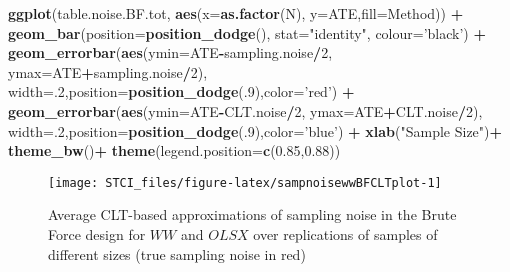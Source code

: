 \documentclass[]{book}
\newenvironment{Shaded}{\begin{snugshade}}{\end{snugshade}}
\newcommand{\KeywordTok}[1]{\textcolor[rgb]{0.13,0.29,0.53}{\textbf{#1}}}
\newcommand{\DataTypeTok}[1]{\textcolor[rgb]{0.13,0.29,0.53}{#1}}
\newcommand{\DecValTok}[1]{\textcolor[rgb]{0.00,0.00,0.81}{#1}}
\newcommand{\FloatTok}[1]{\textcolor[rgb]{0.00,0.00,0.81}{#1}}
\newcommand{\StringTok}[1]{\textcolor[rgb]{0.31,0.60,0.02}{#1}}
\newcommand{\OperatorTok}[1]{\textcolor[rgb]{0.81,0.36,0.00}{\textbf{#1}}}
\newcommand{\NormalTok}[1]{#1}
\theoremstyle{definition}
\theoremstyle{definition}
\theoremstyle{definition}
\theoremstyle{remark}
\begin{document}
\begin{Shaded}
\begin{Highlighting}[]
\KeywordTok{ggplot}\NormalTok{(table.noise.BF.tot, }\KeywordTok{aes}\NormalTok{(}\DataTypeTok{x=}\KeywordTok{as.factor}\NormalTok{(N), }\DataTypeTok{y=}\NormalTok{ATE,}\DataTypeTok{fill=}\NormalTok{Method)) }\OperatorTok{+}
\StringTok{  }\KeywordTok{geom_bar}\NormalTok{(}\DataTypeTok{position=}\KeywordTok{position_dodge}\NormalTok{(), }\DataTypeTok{stat=}\StringTok{"identity"}\NormalTok{, }\DataTypeTok{colour=}\StringTok{'black'}\NormalTok{) }\OperatorTok{+}
\StringTok{  }\KeywordTok{geom_errorbar}\NormalTok{(}\KeywordTok{aes}\NormalTok{(}\DataTypeTok{ymin=}\NormalTok{ATE}\OperatorTok{-}\NormalTok{sampling.noise}\OperatorTok{/}\DecValTok{2}\NormalTok{, }\DataTypeTok{ymax=}\NormalTok{ATE}\OperatorTok{+}\NormalTok{sampling.noise}\OperatorTok{/}\DecValTok{2}\NormalTok{), }\DataTypeTok{width=}\NormalTok{.}\DecValTok{2}\NormalTok{,}\DataTypeTok{position=}\KeywordTok{position_dodge}\NormalTok{(.}\DecValTok{9}\NormalTok{),}\DataTypeTok{color=}\StringTok{'red'}\NormalTok{) }\OperatorTok{+}
\StringTok{  }\KeywordTok{geom_errorbar}\NormalTok{(}\KeywordTok{aes}\NormalTok{(}\DataTypeTok{ymin=}\NormalTok{ATE}\OperatorTok{-}\NormalTok{CLT.noise}\OperatorTok{/}\DecValTok{2}\NormalTok{, }\DataTypeTok{ymax=}\NormalTok{ATE}\OperatorTok{+}\NormalTok{CLT.noise}\OperatorTok{/}\DecValTok{2}\NormalTok{), }\DataTypeTok{width=}\NormalTok{.}\DecValTok{2}\NormalTok{,}\DataTypeTok{position=}\KeywordTok{position_dodge}\NormalTok{(.}\DecValTok{9}\NormalTok{),}\DataTypeTok{color=}\StringTok{'blue'}\NormalTok{) }\OperatorTok{+}
\StringTok{  }\KeywordTok{xlab}\NormalTok{(}\StringTok{"Sample Size"}\NormalTok{)}\OperatorTok{+}
\StringTok{  }\KeywordTok{theme_bw}\NormalTok{()}\OperatorTok{+}
\StringTok{  }\KeywordTok{theme}\NormalTok{(}\DataTypeTok{legend.position=}\KeywordTok{c}\NormalTok{(}\FloatTok{0.85}\NormalTok{,}\FloatTok{0.88}\NormalTok{))}
\end{Highlighting}
\end{Shaded}

\begin{figure}[htbp]

{\centering \texttt{[image: STCI\_files/figure-latex/sampnoisewwBFCLTplot-1]} 

}

\caption{Average CLT-based approximations of sampling noise in the Brute Force design for $WW$ and $OLSX$ over replications of samples of different sizes (true sampling noise in red)}\label{fig:sampnoisewwBFCLTplot}
\end{figure}
\end{document}
